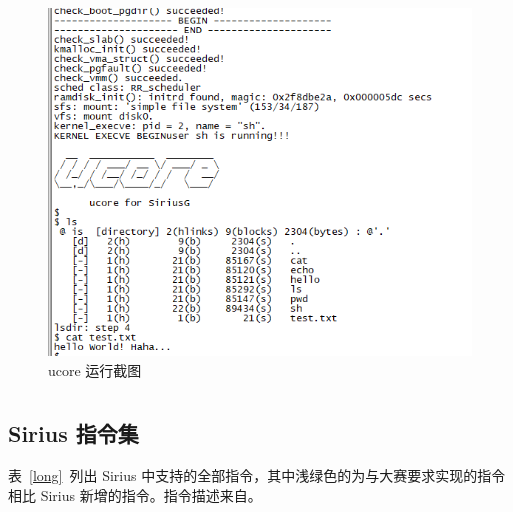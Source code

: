 \documentclass[blue,normal,cn,hide]{elegantbook}
\begin{document}
\begin{figure}[htpb]
    \centering
    \includegraphics[width=.6\textwidth]{figures/ucore}
    \caption{ucore 运行截图}
    \label{fig:ucore}
\end{figure}

\appendix

\chapter{}
\section{Sirius 指令集} \label{section:ISA}

表~\ref{long}~列出 Sirius 中支持的全部指令，其中浅绿色的为与大赛要求实现的指令相比
Sirius 新增的指令。指令描述来自\cite{MIPS2A}。
\end{document}
